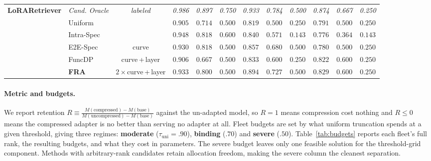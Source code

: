 \documentclass{article}
\newcommand{\xmark}{\ding{55}}%
\begin{document}
\begin{table}[t]
{\begin{tabular}{l | l | c | ccc | ccc | ccc}
    \midrule[\heavyrulewidth]
    \multirow{6}{*}{\textbf{LoRARetriever}}
    & \cellcolor{oraclebg}\textit{Cand. Oracle} & \cellcolor{oraclebg}\textit{labeled} & \cellcolor{oraclebg}\textit{0.986} & \cellcolor{oraclebg}\textit{0.897} & \cellcolor{oraclebg}\textit{0.750} & \cellcolor{oraclebg}\textit{0.933} & \cellcolor{oraclebg}\textit{0.784} & \cellcolor{oraclebg}\textit{0.500} & \cellcolor{oraclebg}\textit{0.874} & \cellcolor{oraclebg}\textit{0.667} & \cellcolor{oraclebg}\textit{0.250} \\
    \cline{2-12}
    & Uniform & \xmark & \phantom{-}$0.905$ & \phantom{-}$0.714$ & \phantom{-}$0.500$ & \phantom{-}$0.819$ & \phantom{-}$0.500$ & \phantom{-}$0.250$ & \phantom{-}$0.791$ & \phantom{-}$0.500$ & \cellcolor{bestbg}\phantom{-}$0.250$ \\
    & Intra-Spec & \xmark & \cellcolor{bestbg}\phantom{-}$0.948$ & \cellcolor{bestbg}\phantom{-}$0.818$ & \cellcolor{bestbg}\phantom{-}$0.600$ & \phantom{-}$0.840$ & \phantom{-}$0.571$ & \phantom{-}$0.143$ & \phantom{-}$0.776$ & \phantom{-}$0.364$ & \phantom{-}$0.143$ \\
    & E2E-Spec & curve & \phantom{-}$0.930$ & \cellcolor{bestbg}\phantom{-}$0.818$ & \phantom{-}$0.500$ & \phantom{-}$0.857$ & \phantom{-}$0.680$ & \cellcolor{bestbg}\phantom{-}$0.500$ & \phantom{-}$0.780$ & \phantom{-}$0.500$ & \cellcolor{bestbg}\phantom{-}$0.250$ \\
    & FuncDP & curve\,+\,layer & \phantom{-}$0.906$ & \phantom{-}$0.667$ & \phantom{-}$0.500$ & \phantom{-}$0.833$ & \phantom{-}$0.600$ & \phantom{-}$0.250$ & \phantom{-}$0.822$ & \cellcolor{bestbg}\phantom{-}$0.600$ & \cellcolor{bestbg}\phantom{-}$0.250$ \\
    & \textbf{FRA} & $2\times$curve\,+\,layer & \phantom{-}$0.933$ & \phantom{-}$0.800$ & \phantom{-}$0.500$ & \cellcolor{bestbg}\phantom{-}$0.894$ & \cellcolor{bestbg}\phantom{-}$0.727$ & \cellcolor{bestbg}\phantom{-}$0.500$ & \cellcolor{bestbg}\phantom{-}$0.829$ & \cellcolor{bestbg}\phantom{-}$0.600$ & \cellcolor{bestbg}\phantom{-}$0.250$ \\
    \bottomrule
\end{tabular}
}
\end{table}

\paragraph{Metric and budgets.} We report retention
$R \equiv \frac{M(\text{compressed}) - M(\text{base})}{M(\text{uncompressed}) - M(\text{base})}$
against the un-adapted model, so $R=1$ means compression cost nothing and $R\le 0$
means the compressed adapter is no better than serving no adapter at all. Fleet
budgets are set by what uniform truncation spends at a given threshold, giving
three regimes: \textbf{moderate} ($\tau_{\mathrm{uni}}{=}.90$), \textbf{binding}
($.70$) and \textbf{severe} ($.50$). Table~\ref{tab:budgets} reports each fleet's
full rank, the resulting budgets, and what they cost in parameters. The severe
budget leaves only one feasible solution for the threshold-grid component.
Methods with arbitrary-rank candidates retain allocation freedom, making the
severe column the cleanest separation.
\end{document}
